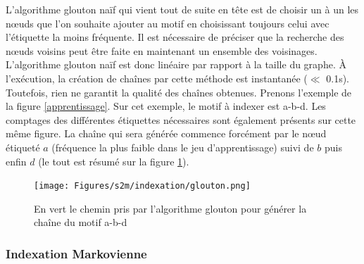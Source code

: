 % 
%  


L'algorithme glouton naïf qui vient tout de suite en tête est de choisir un à un les n\oe{}uds que l'on souhaite ajouter au motif en choisissant toujours celui avec l'étiquette la moins fréquente.
Il est nécessaire de préciser que la recherche des n\oe{}uds voisins peut être faite en maintenant un ensemble des voisinages.
L'algorithme glouton naïf est donc linéaire par rapport à la taille du graphe.
À l'exécution, la création de chaînes par cette méthode est instantanée ($\ll$ 0.1s).
Toutefois, rien ne garantit la qualité des chaînes obtenues.
Prenons l'exemple de la figure \ref{apprentissage}.
Sur cet exemple, le motif à indexer est a-b-d.
Les comptages des différentes étiquettes nécessaires sont également présents sur cette même figure.
La chaîne qui sera générée commence forcément par le n\oe{}ud étiqueté $a$ (fréquence la plus faible dans le jeu d'apprentissage) suivi de $b$ puis enfin $d$ (le tout est résumé sur la figure \ref{glouton}).

\begin{figure}[!ht]
  \begin{center}
    \texttt{[image: Figures/s2m/indexation/glouton.png]}
    \caption{\label{glouton}En vert le chemin pris par l'algorithme glouton pour générer la chaîne du motif a-b-d}
  \end{center}
\end{figure}

\subsubsection{Indexation Markovienne}

\label{index_markov}

